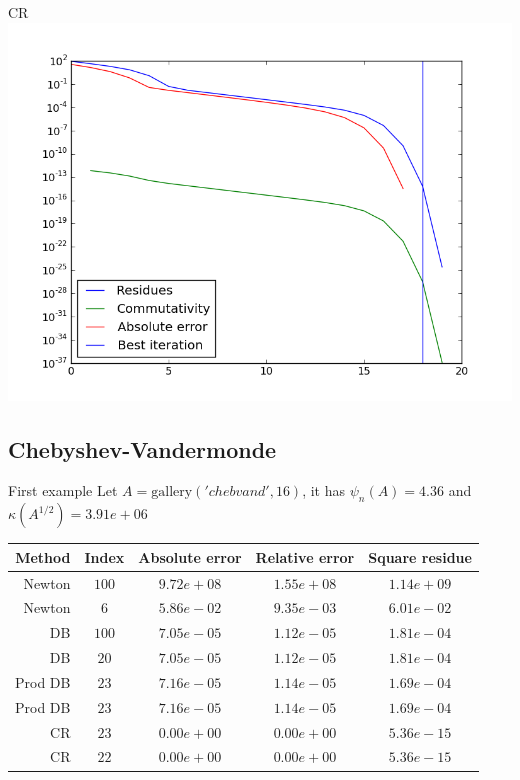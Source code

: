 \documentclass{beamer}
\theoremstyle{plain}
\theoremstyle{definition}
\theoremstyle{remark}
\begin{document}
\begin{frame}{CR}
  \includegraphics[width=\textwidth,height=\textheight]{"moler/CR - absplot"}
\end{frame}


\subsection{Chebyshev-Vandermonde}

\begin{frame}{First example}
  Let $A = \mathrm{gallery}('chebvand',16)$, it has $\psi_n(A) = 4.36$
  and $\kappa(A^{1/2}) = 3.91e+06$

  \begin{tabular}{r| c c c c}
    Method & Index & Absolute error & Relative error & Square residue \\
    \hline
    Newton & $100$ & $9.72e+08$ & $1.55e+08$ & $1.14e+09$ \\
    Newton & $6$ & $5.86e-02$ & $9.35e-03$ & $6.01e-02$ \\
    \hline
    DB & $100$ & $7.05e-05$ & $1.12e-05$ & $1.81e-04$ \\
    DB & $20$ & $7.05e-05$ & $1.12e-05$ & $1.81e-04$ \\
    \hline
    Prod DB & $23$ & $7.16e-05$ & $1.14e-05$ & $1.69e-04$ \\
    Prod DB & $23$ & $7.16e-05$ & $1.14e-05$ & $1.69e-04$ \\
    \hline
    CR & $23$ & $0.00e+00$ & $0.00e+00$ & $5.36e-15$ \\
    CR & $22$ & $0.00e+00$ & $0.00e+00$ & $5.36e-15$ \\
\end{tabular}
\end{frame}
\end{document}
